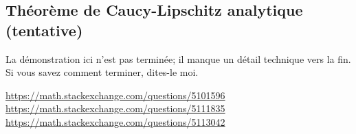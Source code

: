 \subsection{Théorème de Caucy-Lipschitz analytique (tentative)}

\begin{probleme}
	La démonstration ici n'est pas terminée; il manque un détail technique vers la fin. Si vous savez comment terminer, dites-le moi.

	\url{https://math.stackexchange.com/questions/5101596}\\
	\url{https://math.stackexchange.com/questions/5111835}\\
	\url{https://math.stackexchange.com/questions/5113042}
\end{probleme}

